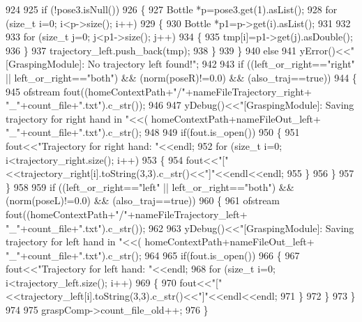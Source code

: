 \begin{DoxyCode}
924 
925     \textcolor{keywordflow}{if} (!pose3.isNull())
926     \{
927         Bottle *p=pose3.get(1).asList();
928         \textcolor{keywordflow}{for} (\textcolor{keywordtype}{size\_t} i=0; i<p->size(); i++)
929         \{
930             Bottle *p1=p->get(i).asList();
931 
932 
933             \textcolor{keywordflow}{for} (\textcolor{keywordtype}{size\_t} j=0; j<p1->size(); j++)
934             \{
935                 tmp[i]=p1->get(j).asDouble();
936             \}
937             trajectory_left.push\_back(tmp);
938         \}
939     \}
940     \textcolor{keywordflow}{else}
941         yError()<<\textcolor{stringliteral}{"[GraspingModule]: No trajectory left found!"};
942 
943     \textcolor{keywordflow}{if} ((left_or_right==\textcolor{stringliteral}{"right"} || left_or_right==\textcolor{stringliteral}{"both"}) && (norm(poseR)!=0.0) && (also\_traj==\textcolor{keyword}{true}))
944     \{
945         ofstream fout((homeContextPath+\textcolor{stringliteral}{"/"}+nameFileTrajectory_right+ \textcolor{stringliteral}{"\_"}+count\_file+\textcolor{stringliteral}{".txt"}).c\_str());
946 
947         yDebug()<<\textcolor{stringliteral}{"[GraspingModule]: Saving trajectory for right hand in "}<<(
      homeContextPath+nameFileOut_left+ \textcolor{stringliteral}{"\_"}+count\_file+\textcolor{stringliteral}{".txt"}).c\_str();
948 
949         \textcolor{keywordflow}{if}(fout.is\_open())
950         \{
951             fout<<\textcolor{stringliteral}{"Trajectory for right hand: "}<<endl;
952             \textcolor{keywordflow}{for} (\textcolor{keywordtype}{size\_t} i=0; i<trajectory_right.size(); i++)
953             \{
954                 fout<<\textcolor{stringliteral}{"["}<<trajectory_right[i].toString(3,3).c\_str()<<\textcolor{stringliteral}{"]"}<<endl<<endl;
955             \}
956         \}
957     \}
958 
959     \textcolor{keywordflow}{if} ((left_or_right==\textcolor{stringliteral}{"left"} || left_or_right==\textcolor{stringliteral}{"both"}) && (norm(poseL)!=0.0) && (also\_traj==\textcolor{keyword}{true}))
960     \{
961         ofstream fout((homeContextPath+\textcolor{stringliteral}{"/"}+nameFileTrajectory_left+ \textcolor{stringliteral}{"\_"}+count\_file+\textcolor{stringliteral}{".txt"}).c\_str());
962 
963         yDebug()<<\textcolor{stringliteral}{"[GraspingModule]: Saving trajectory for left hand in "}<<(
      homeContextPath+nameFileOut_left+ \textcolor{stringliteral}{"\_"}+count\_file+\textcolor{stringliteral}{".txt"}).c\_str();
964 
965         \textcolor{keywordflow}{if}(fout.is\_open())
966         \{
967             fout<<\textcolor{stringliteral}{"Trajectory for left hand: "}<<endl;
968             \textcolor{keywordflow}{for} (\textcolor{keywordtype}{size\_t} i=0; i<trajectory_left.size(); i++)
969             \{
970                 fout<<\textcolor{stringliteral}{"["}<<trajectory_left[i].toString(3,3).c\_str()<<\textcolor{stringliteral}{"]"}<<endl<<endl;
971             \}
972         \}
973     \}
974 
975     graspComp->count\_file\_old++;
976 \}
\end{DoxyCode}
